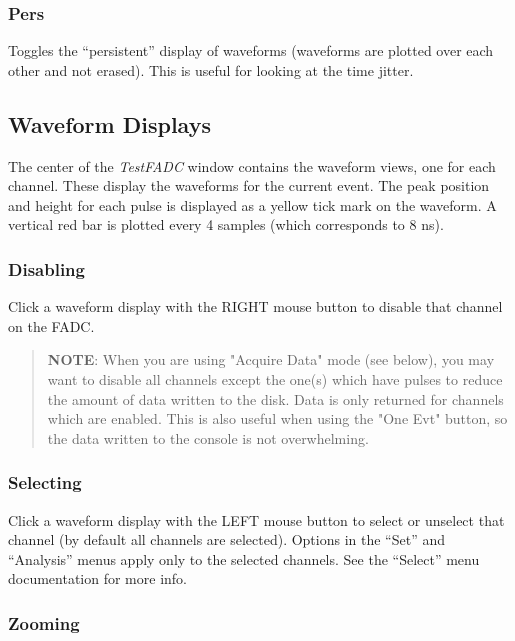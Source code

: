 \documentclass{article}
\newcommand{\testfadc}{\emph{TestFADC} }
\begin{document}
\subsubsection{Pers}

Toggles the ``persistent'' display of waveforms (waveforms are plotted
over each other and not erased).  This is useful for looking at the
time jitter.

\subsection{Waveform Displays}

The center of the \testfadc window contains the waveform views, one
for each channel. These display the waveforms for the current event.
The peak position and height for each pulse is displayed as a yellow
tick mark on the waveform.  A vertical red bar is plotted every 4
samples (which corresponds to 8 ns).

\subsubsection{Disabling}

Click a waveform display with the RIGHT mouse button to disable that
channel on the FADC.  

\begin{quote}
\textbf{NOTE}: When you are using "Acquire Data" mode (see below), you
may want to disable all channels except the one(s) which have
pulses to reduce the amount of data written to the disk. Data
is only returned for channels which are enabled. This is also
useful when using the "One Evt" button, so the data written to
the console is not overwhelming.
\end{quote}


\subsubsection{Selecting}

Click a waveform display with the LEFT mouse button to select or
unselect that channel (by default all channels are selected).  Options
in the ``Set'' and ``Analysis'' menus  apply only to the selected
channels. See the ``Select'' menu documentation for more info.

\subsubsection{Zooming}
\end{document}

